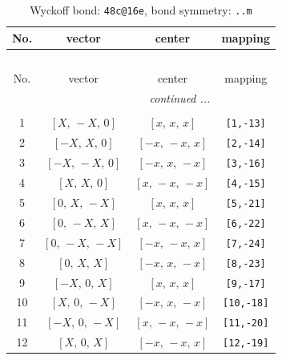 \documentclass[fleqn,8pt]{jsarticle}
\begin{document}
\begin{longtable}{cccc}
\caption{Wyckoff bond: {\tt 48c@16e}, bond symmetry: {\tt ..m}}
 \\
 \hline \hline
No. & vector & center & mapping \\ \hline \endfirsthead

\multicolumn{3}{l}{\tablename\ \thetable{}} \\
 \hline \hline
No. & vector & center & mapping \\ \hline \endhead

 \hline \hline
\multicolumn{3}{r}{\footnotesize\it continued ...} \\ \endfoot

 \hline \hline
\multicolumn{3}{r}{} \\ \endlastfoot

1 & $\left[ X,\, - X,\, 0 \right]$ & $\left[ x,\, x,\, x \right]$ & {\tt [1,-13]} \\ \hline
2 & $\left[ - X,\, X,\, 0 \right]$ & $\left[ - x,\, - x,\, x \right]$ & {\tt [2,-14]} \\ \hline
3 & $\left[ - X,\, - X,\, 0 \right]$ & $\left[ - x,\, x,\, - x \right]$ & {\tt [3,-16]} \\ \hline
4 & $\left[ X,\, X,\, 0 \right]$ & $\left[ x,\, - x,\, - x \right]$ & {\tt [4,-15]} \\ \hline
5 & $\left[ 0,\, X,\, - X \right]$ & $\left[ x,\, x,\, x \right]$ & {\tt [5,-21]} \\ \hline
6 & $\left[ 0,\, - X,\, X \right]$ & $\left[ x,\, - x,\, - x \right]$ & {\tt [6,-22]} \\ \hline
7 & $\left[ 0,\, - X,\, - X \right]$ & $\left[ - x,\, - x,\, x \right]$ & {\tt [7,-24]} \\ \hline
8 & $\left[ 0,\, X,\, X \right]$ & $\left[ - x,\, x,\, - x \right]$ & {\tt [8,-23]} \\ \hline
9 & $\left[ - X,\, 0,\, X \right]$ & $\left[ x,\, x,\, x \right]$ & {\tt [9,-17]} \\ \hline
10 & $\left[ X,\, 0,\, - X \right]$ & $\left[ - x,\, x,\, - x \right]$ & {\tt [10,-18]} \\ \hline
11 & $\left[ - X,\, 0,\, - X \right]$ & $\left[ x,\, - x,\, - x \right]$ & {\tt [11,-20]} \\ \hline
12 & $\left[ X,\, 0,\, X \right]$ & $\left[ - x,\, - x,\, x \right]$ & {\tt [12,-19]} \\
\end{longtable}
\renewcommand{\arraystretch}{1.2}
\end{document}
